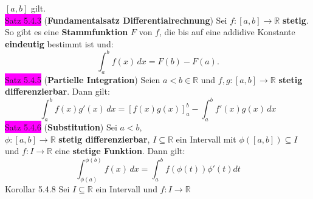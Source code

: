\documentclass[landscape, 10pt]{article}
\newcommand{\R}{\mathbb{R}}
\begin{document}
\begin{multicols}{3}
                     \textcolor{NavyBlue}{$[a,b]$} gilt.\\
              \colorbox{magenta}{Satz 5.4.3} 
              (\textbf{Fundamentalsatz Differentialrechnung}) 
                     Sei \textcolor{NavyBlue}{
                     $f:[a,b]\longrightarrow\R$} 
                     \textbf{stetig}. So gibt es eine 
                     \textbf{Stammfunktion} 
                     \textcolor{NavyBlue}{$F$} von 
                     \textcolor{NavyBlue}{$f$},
                     die bis auf eine addidive Konstante 
                     \textbf{eindeutig} bestimmt ist und: 
                     \begin{equation*}
                           \int_a^bf(x)\,dx=F(b)-F(a).
                     \end{equation*}
              \colorbox{magenta}{Satz 5.4.5} 
              (\textbf{Partielle Integration}) 
                     Seien \textcolor{NavyBlue}{$a<b\in\R$} und 
                     \textcolor{NavyBlue}{
                     $f,g:[a,b]\longrightarrow\R$}
                     \textbf{stetig differenzierbar}. Dann gilt:
                     \begin{equation*}
                            \int_a^bf(x)g'(x)\,dx
                            =[f(x)g(x)]_a^b
                            -\int_a^bf'(x)g(x)\,dx
                     \end{equation*}
              \colorbox{magenta}{Satz 5.4.6} 
              (\textbf{Substitution}) 
                     Sei \textcolor{NavyBlue}{$a<b$},\\
                     \textcolor{NavyBlue}{
                     $\phi:[a,b]\longrightarrow\R$}
                     \textbf{stetig differenzierbar}, 
                     \textcolor{NavyBlue}{$I\subseteq\R$}
                     ein Intervall mit 
                     \textcolor{NavyBlue}{
                     $\phi([a,b])\subseteq I$}
                     und \textcolor{NavyBlue}{
                     $f:I\longrightarrow\R$} eine 
                     \textbf{stetige Funktion}. Dann gilt:
                     \begin{equation*}
                            \int_{\phi(a)}^{\phi(b)}f(x)\,dx
                            =\int_a^bf(\phi(t))\phi'(t)dt
                     \end{equation*}
              \colorbox{BurntOrange}{Korollar 5.4.8} 
                     Sei \textcolor{NavyBlue}{$I\subseteq\R$}
                     ein Intervall und \textcolor{NavyBlue}{
                     $f:I\longrightarrow\R$} 

\end{multicols}
\end{document}

